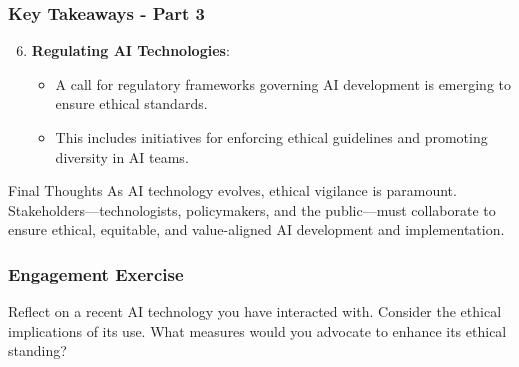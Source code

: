 \documentclass[aspectratio=169]{beamer}
\begin{document}
\begin{frame}[fragile]
    \frametitle{Key Takeaways - Part 3}
    \begin{enumerate}
        \setcounter{enumi}{5}
        
        \item \textbf{Regulating AI Technologies}:
        \begin{itemize}
            \item A call for regulatory frameworks governing AI development is emerging to ensure ethical standards.
            \item This includes initiatives for enforcing ethical guidelines and promoting diversity in AI teams.
        \end{itemize}
    \end{enumerate}
    
    \begin{block}{Final Thoughts}
        As AI technology evolves, ethical vigilance is paramount. Stakeholders—technologists, policymakers, 
        and the public—must collaborate to ensure ethical, equitable, 
        and value-aligned AI development and implementation.
    \end{block}
\end{frame}

\begin{frame}[fragile]
    \frametitle{Engagement Exercise}
    Reflect on a recent AI technology you have interacted with. 
    Consider the ethical implications of its use. 
    What measures would you advocate to enhance its ethical standing?
\end{frame}
\end{document}
